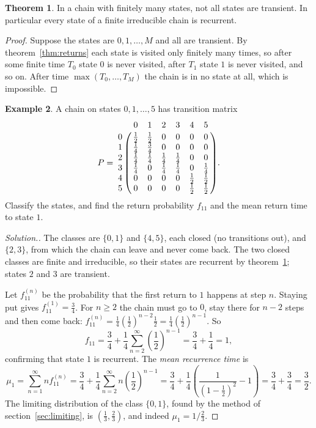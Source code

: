\documentclass[12pt,a4paper]{report}
\theoremstyle{definition}
\newtheorem{thm}{Theorem}[section]
\newtheorem{exa}[thm]{Example}
\newenvironment{solution}
  {\renewcommand{\qedsymbol}{}\begin{proof}[\textit{Solution}.]}
  {\end{proof}}
\begin{document}
\begin{thm}
\label{thm:finiterecurrent}
In a chain with finitely many states, not all states are transient. In particular every
state of a finite irreducible chain is recurrent.
\end{thm}

\begin{proof}
Suppose the states are $0, 1, \dots, M$ and all are transient. By theorem~\ref{thm:returns}
each state is visited only finitely many times, so after some finite time $T_0$ state $0$ is
never visited, after $T_1$ state $1$ is never visited, and so on. After time
$\max(T_0, \dots, T_M)$ the chain is in no state at all, which is impossible.
\end{proof}

\begin{exa}
\label{ex:firstpassage}
A chain on states $0, 1, \dots, 5$ has transition matrix
\[P = \bordermatrix{~ & 0 & 1 & 2 & 3 & 4 & 5\cr
0 & \frac12 & \frac12 & 0 & 0 & 0 & 0\cr
1 & \frac14 & \frac34 & 0 & 0 & 0 & 0\cr
2 & \frac14 & \frac14 & \frac14 & \frac14 & 0 & 0\cr
3 & \frac14 & 0 & \frac14 & \frac14 & 0 & \frac14\cr
4 & 0 & 0 & 0 & 0 & \frac12 & \frac12\cr
5 & 0 & 0 & 0 & 0 & \frac12 & \frac12\cr} .\]
Classify the states, and find the return probability $f_{11}$ and the mean return time to
state $1$.
\end{exa}

\begin{solution}
The classes are $\{0, 1\}$ and $\{4, 5\}$, each closed (no transitions out), and $\{2, 3\}$,
from which the chain can leave and never come back. The two closed classes are finite and
irreducible, so their states are recurrent by theorem~\ref{thm:finiterecurrent}; states $2$
and $3$ are transient.

Let $f_{11}^{(n)}$ be the probability that the first return to $1$ happens at step $n$. Staying
put gives $f_{11}^{(1)} = \frac34$. For $n\geq 2$ the chain must go to $0$, stay there for
$n - 2$ steps and then come back: $f_{11}^{(n)} = \frac14\left(\frac12\right)^{n - 2}\frac12 = \frac14\left(\frac12\right)^{n - 1}$.
So
\[f_{11} = \frac34 + \frac14\sum_{n=2}^\infty\left(\frac12\right)^{n - 1} = \frac34 + \frac14 = 1,\]
confirming that state $1$ is recurrent. The \emph{mean recurrence time} is
\[\mu_1 = \sum_{n=1}^\infty nf_{11}^{(n)} = \frac34 + \frac14\sum_{n=2}^\infty n\left(\frac12\right)^{n - 1}
= \frac34 + \frac14\left(\frac{1}{(1 - \frac12)^2} - 1\right) = \frac34 + \frac34 = \frac32 .\]
The limiting distribution of the class $\{0, 1\}$, found by the method of
section~\ref{sec:limiting}, is $\left(\frac13, \frac23\right)$, and indeed $\mu_1 = 1\big/\frac23$.
\end{solution}
\end{document}
